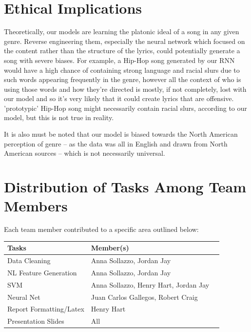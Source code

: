 \documentclass[journal]{IEEEtran}
\begin{document}
\section{Ethical Implications}

Theoretically, our models are learning the platonic ideal of a song in any given genre. Reverse engineering them, especially the neural network which focused on the content rather than the structure of the lyrics, could potentially generate a song with severe biases. For example, a Hip-Hop song generated by our RNN would have a high chance of containing strong language and racial slurs due to such words appearing frequently in the genre, however all the context of who is using those words and how they're directed is mostly, if not completely, lost with our model and so it's very likely that it could create lyrics that are offensive. 'prototypic' Hip-Hop song might necessarily contain racial slurs, according to our model, but this is not true in reality.

It is also must be noted that our model is biased towards the North American perception of genre  -- as the data was all in English and drawn from North American sources -- which is not necessarily universal.


\section{Distribution of Tasks Among Team Members}

Each team member contributed to a specific area outlined below:

\begin{table}[h!]
    \label{tab:table1}
    \begin{tabular}{l|l|l|}
      \textbf{Tasks} & \textbf{Member(s)}\\

      \hline
	Data Cleaning & Anna Sollazzo, Jordan Jay\\
	NL Feature Generation & Anna Sollazzo, Jordan Jay\\
	SVM & Anna Sollazzo, Henry Hart, Jordan Jay\\
	Neural Net & Juan Carlos Gallegos, Robert Craig\\
	Report Formatting/Latex & Henry Hart\\
	Presentation Slides & All\\

    \end{tabular}
\end{table}
\end{document}
